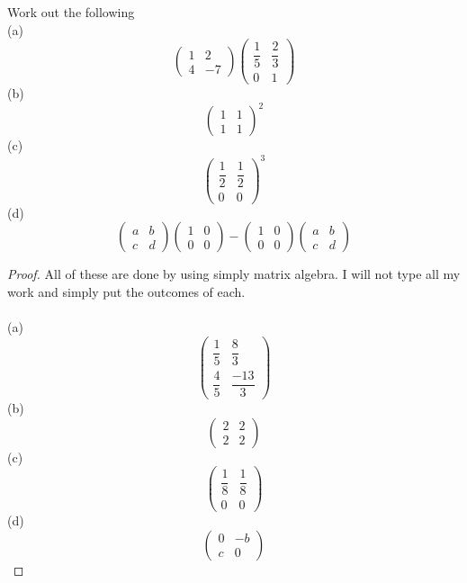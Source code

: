 \documentclass[12pt]{article}
\newenvironment{problem}[2][Problem]{\begin{trivlist}
\item[\hskip \labelsep {\bfseries #1}\hskip \labelsep {\bfseries #2.}]}{\end{trivlist}}
\begin{document}
\begin{problem}{4.1.7}
Work out the following \\ 
(a)
 $$\begin{pmatrix}
	1 & 2\\
	4 & -7
	\end{pmatrix}
	\begin{pmatrix}
	\dfrac{1}{5} & \dfrac{2}{3} \\
	0 & 1
	\end{pmatrix}
	$$
\bigskip
(b)
 $$\begin{pmatrix}
	1 & 1\\
	1 & 1
	\end{pmatrix}^2
	$$
	\bigskip
	(c)
	 $$\begin{pmatrix}
	\dfrac{1}{2} & \dfrac{1}{2}\\
	0 & 0
	\end{pmatrix}^3
	$$
	\bigskip
	(d)
	 $$\begin{pmatrix}
	a & b\\
	c & d
	\end{pmatrix}
	\begin{pmatrix}
	1 & 0 \\
	0 & 0
	\end{pmatrix}
	-
	\begin{pmatrix}
	1 & 0 \\
	0 & 0
	\end{pmatrix}
	\begin{pmatrix}
	a & b\\
	c & d
	\end{pmatrix}
	$$
\end{problem}

\begin{proof} 
All of these are done by using simply matrix algebra. I will not type all my work and simply put the outcomes of each. \\ \\
(a)  $$\begin{pmatrix}
	\dfrac{1}{5} & \dfrac{8}{3}\\
	\dfrac{4}{5} & \dfrac{-13}{3}
	\end{pmatrix}
	$$
	\bigskip
	(b)
	$$\begin{pmatrix}
	2 & 2\\
	2& 2
	\end{pmatrix}
	$$
	\bigskip
	(c)
	$$\begin{pmatrix}
	\dfrac{1}{8} & \dfrac{1}{8}\\
	0 & 0
	\end{pmatrix}
	$$
	\bigskip
	(d)
	$$\begin{pmatrix}
	0 & -b\\
	c & 0
	\end{pmatrix}
	$$
	\bigskip
\end{proof}
\end{document}
